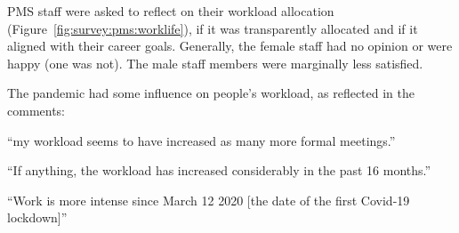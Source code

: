 PMS staff were asked to reflect on their workload allocation (Figure~\ref{fig:survey:pms:worklife}), if it was transparently allocated and if it aligned with their career goals.
Generally, the female staff had no opinion or were happy (one was not). The male staff members were marginally less satisfied. 






The pandemic had some influence on people's workload, as reflected in the comments: 
\begin{myquote}
``my workload seems to have increased as many more formal meetings.''
\end{myquote}
\begin{myquote}
``If anything, the workload has increased considerably in the past 16 months.''
\end{myquote}
\begin{myquote}
``Work is more intense since March 12 2020 [the date of the first Covid-19 lockdown]''
\end{myquote}




